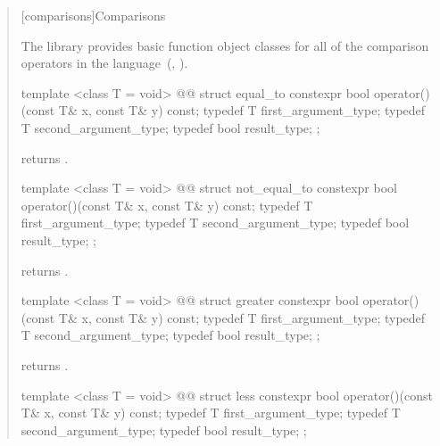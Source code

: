 \begin{quote}
\setcounter{subsection}{5}
[comparisons]{Comparisons}

\pnum
The library provides basic function object classes for all of the comparison
operators in the language~(, ).

%
\begin{itemdecl}
template <class T = void>
  @@
struct equal_to {
  constexpr bool operator()(const T& x, const T& y) const;
  typedef T first_argument_type;
  typedef T second_argument_type;
  typedef bool result_type;
};
\end{itemdecl}

\begin{itemdescr}
\pnum
{} returns .
\end{itemdescr}

%
\begin{itemdecl}
template <class T = void>
  @@
struct not_equal_to {
  constexpr bool operator()(const T& x, const T& y) const;
  typedef T first_argument_type;
  typedef T second_argument_type;
  typedef bool result_type;
};
\end{itemdecl}

\begin{itemdescr}
\pnum
{} returns .
\end{itemdescr}

%
\begin{itemdecl}
template <class T = void>
  @@
struct greater {
  constexpr bool operator()(const T& x, const T& y) const;
  typedef T first_argument_type;
  typedef T second_argument_type;
  typedef bool result_type;
};
\end{itemdecl}

\begin{itemdescr}
\pnum
{} returns .
\end{itemdescr}

%
\begin{itemdecl}
template <class T = void>
  @@
struct less {
  constexpr bool operator()(const T& x, const T& y) const;
  typedef T first_argument_type;
  typedef T second_argument_type;
  typedef bool result_type;
};
\end{itemdecl}


\end{quote}
